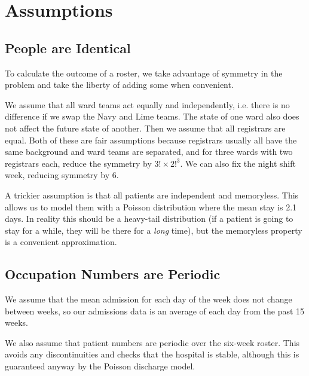\documentclass[a4paper]{article}
\begin{document}
\section{Assumptions}

\subsection{People are Identical}

To calculate the outcome of a roster, we take advantage of symmetry in the problem and take the liberty of adding some when convenient.

We assume that all ward teams act equally and independently, i.e. there is no difference if we swap the Navy and Lime teams. The state of one ward also does not affect the future state of another. Then we assume that all registrars are equal. Both of these are fair assumptions because registrars usually all have the same background and ward teams are separated, and for three wards with two registrars each, reduce the symmetry by $3!\times2!^3$. We can also fix the night shift week, reducing symmetry by 6.

A trickier assumption is that all patients are independent and memoryless. This allows us to model them with a Poisson distribution where the mean stay is 2.1 days.
In reality this should be a heavy-tail distribution (if a patient is going to stay for a while, they will be there for a \emph{long} time), but the memoryless property is a convenient approximation.

\subsection{Occupation Numbers are Periodic}

We assume that the mean admission for each day of the week does not change between weeks, so our admissions data is an average of each day from the past 15 weeks.

We also assume that patient numbers are periodic over the six-week roster. This avoids any discontinuities and checks that the hospital is stable, although this is guaranteed anyway by the Poisson discharge model.
\end{document}
